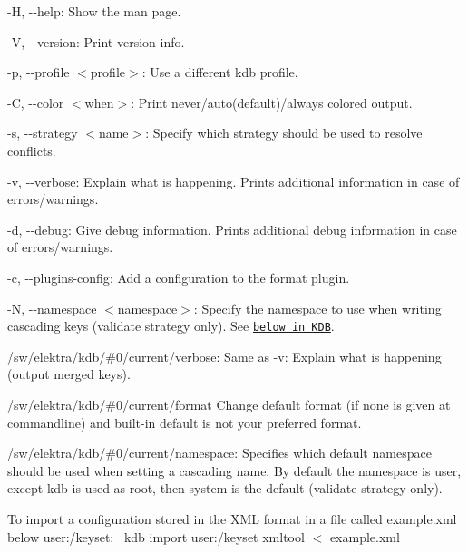 \begin{DoxyItemize}
\item {\ttfamily -\/H}, {\ttfamily -\/-\/help}\+: Show the man page.
\item {\ttfamily -\/V}, {\ttfamily -\/-\/version}\+: Print version info.
\item {\ttfamily -\/p}, {\ttfamily -\/-\/profile $<$profile$>$}\+: Use a different kdb profile.
\item {\ttfamily -\/C}, {\ttfamily -\/-\/color $<$when$>$}\+: Print never/auto(default)/always colored output.
\item {\ttfamily -\/s}, {\ttfamily -\/-\/strategy $<$name$>$}\+: Specify which strategy should be used to resolve conflicts.
\item {\ttfamily -\/v}, {\ttfamily -\/-\/verbose}\+: Explain what is happening. Prints additional information in case of errors/warnings.
\item {\ttfamily -\/d}, {\ttfamily -\/-\/debug}\+: Give debug information. Prints additional debug information in case of errors/warnings.
\item {\ttfamily -\/c}, {\ttfamily -\/-\/plugins-\/config}\+: Add a configuration to the format plugin.
\item {\ttfamily -\/N}, {\ttfamily -\/-\/namespace $<$namespace$>$}\+: Specify the namespace to use when writing cascading keys ({\ttfamily validate} strategy only). See \href{#KDB}{\tt below in K\+DB}.
\end{DoxyItemize}


\begin{DoxyItemize}
\item {\ttfamily /sw/elektra/kdb/\#0/current/verbose}\+: Same as {\ttfamily -\/v}\+: Explain what is happening (output merged keys).
\item {\ttfamily /sw/elektra/kdb/\#0/current/format} Change default format (if none is given at commandline) and built-\/in default is not your preferred format.
\item {\ttfamily /sw/elektra/kdb/\#0/current/namespace}\+: Specifies which default namespace should be used when setting a cascading name. By default the namespace is user, except {\ttfamily kdb} is used as root, then {\ttfamily system} is the default ({\ttfamily validate} strategy only).
\end{DoxyItemize}

To import a configuration stored in the X\+ML format in a file called {\ttfamily example.\+xml} below {\ttfamily user\+:/keyset}\+:~\newline
 {\ttfamily kdb import user\+:/keyset xmltool $<$ example.\+xml}


